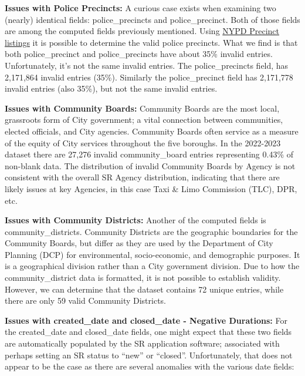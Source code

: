 \documentclass[linenumber]{jdsart}
\begin{document}
\label{sec:police-precincts}
\textbf{Issues with Police Precincts:} A curious case exists when 
examining two (nearly) identical fields: police\_precincts and 
police\_precinct. Both of those fields are among the computed fields 
previously mentioned. Using 
\href{https://www.nyc.gov/site/nypd/bureaus/patrol/precincts-landing.page}
{NYPD Precinct listings} it is possible to determine the valid 
police precincts. What we find is that both police\_precinct 
and police\_precincts  have about 35\% invalid entries. Unfortunately, 
it's not the same invalid entries. The police\_precincts field, 
has 2,171,864 invalid entries (35\%). Similarly the 
police\_precinct field has 2,171,778 invalid entries 
(also 35\%), but not the same invalid entries. 


\label{sec:communityboards}
\textbf{Issues with Community Boards:} Community Boards are the most 
local, grassroots form of City government; a vital connection 
between communities, elected officials, and City agencies. Community 
Boards often service as a measure of the equity of City services 
throughout the five boroughs. In the 2022-2023 dataset there 
are 27,276 invalid community\_board entries representing 0.43\% 
of non-blank data. The distribution of invalid Community Boards 
by Agency is not consistent with the overall SR Agency distribution,
indicating that there are likely issues at key Agencies, in 
this case Taxi \& Limo Commission (TLC), DPR, etc. 


\label{sec:communitydistrict}
\textbf{Issues with Community Districts:} Another of the computed fields 
is community\_districts. Community Districts 
are the geographic boundaries for the Community Boards, but differ as they
are used by the Department of City Planning (DCP) for environmental, 
socio-economic, and demographic purposes. It is a geographical 
division rather than a City government division. Due to how the 
community\_district data is formatted, it is not possible to 
establish validity. However, we can determine that the dataset 
contains 72 unique entries, while there are only 59 
valid Community Districts. 
	

\label{sec:negativeduration}
\textbf{Issues with created\_date and closed\_date - Negative Durations:} For 
the created\_date and closed\_date fields, one might 
expect that these two fields are automatically populated by the 
SR application software; associated with perhaps setting an SR status 
to ``new'' or ``closed''. Unfortunately, that does not appear 
to be the case as there are several anomalies with the various date 
fields:
\end{document}
